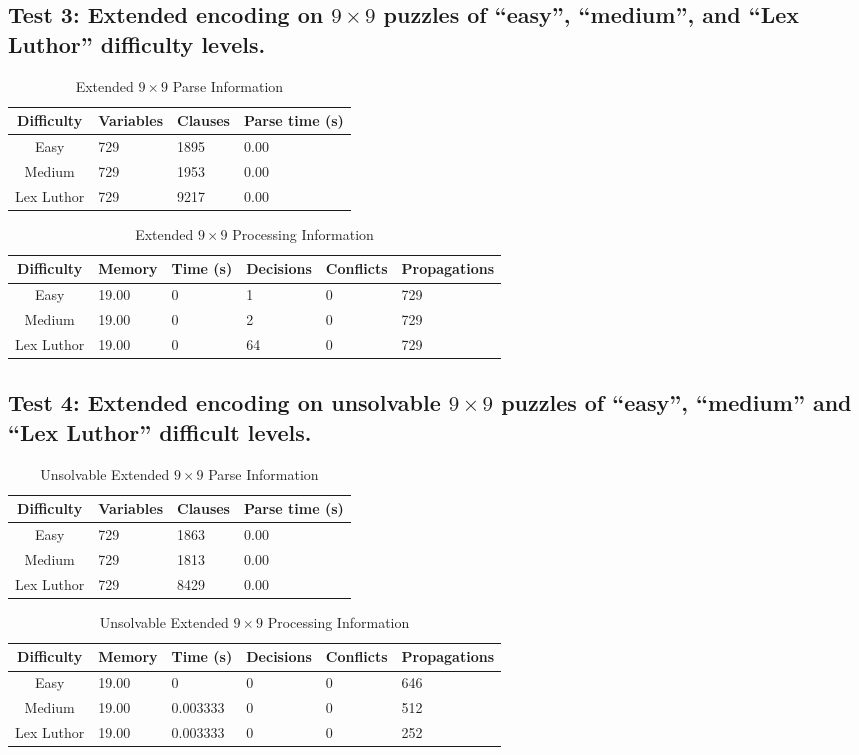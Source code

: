 \documentclass[conference,draftclsnofoot]{IEEEtran}
\begin{document}
\subsection{Test 3: Extended encoding on $9 \times 9$ puzzles of ``easy'', ``medium'',
and ``Lex Luthor'' difficulty levels.}
\FloatBarrier
\begin{table}[!h]
	\centering
	\begin{tabular}{c | l l l}
		Difficulty & Variables & Clauses & Parse time (s) \\\hline
		Easy 		& 729 & 1895 & 0.00 \\
		Medium 		& 729 & 1953 & 0.00 \\
		Lex Luthor 	& 729 & 9217 & 0.00
	\end{tabular}
	\caption{Extended $9 \times 9$ Parse Information}
	\label{tab:extended_9x9_parse}
\end{table}
\begin{table}[!h]
	\centering
	\begin{tabular}{c | l l p{20pt} p{20pt} l}
		Difficulty & Memory & Time (s) & Decisions &
		Conflicts & Propagations \\\hline
		Easy 		& 19.00 & 0 	& 1  & 0 & 729\\
		Medium 		& 19.00 & 0 	& 2  & 0 & 729\\
		Lex Luthor 	& 19.00 & 0 	& 64 & 0 & 729
	\end{tabular}
	\caption{Extended $9 \times 9$ Processing Information}
	\label{tab:extended_9x9_proc}
\end{table}
\FloatBarrier

\subsection{Test 4: Extended encoding on unsolvable $9 \times 9$ puzzles of ``easy'',
``medium'' and ``Lex Luthor'' difficult levels.}
\FloatBarrier
\begin{table}[!h]
	\centering
	\begin{tabular}{c | l l l}
		Difficulty & Variables & Clauses & Parse time (s) \\\hline
		Easy 		& 729 & 1863 & 0.00 \\
		Medium 		& 729 & 1813 & 0.00 \\
		Lex Luthor 	& 729 & 8429 & 0.00
	\end{tabular}
	\caption{Unsolvable Extended $9 \times 9$ Parse Information}
	\label{tab:extended_9x9_unsolvable_parse}
\end{table}
\begin{table}[!h]
	\centering
	\begin{tabular}{c | l l p{20pt} p{20pt}  l }
		Difficulty & Memory & Time (s) & Decisions &
		Conflicts & Propagations \\\hline
		Easy 		& 19.00 & 0 & 0  & 0  & 646 \\
		Medium 		& 19.00 & 0.003333 & 0 & 0  & 512 \\
		Lex Luthor 	& 19.00 & 0.003333 & 0 & 0 & 252
	\end{tabular}
	\caption{Unsolvable Extended $9 \times 9$ Processing Information}
	\label{tab:extended_8x8_unsolvable_proc}
\end{table}
\FloatBarrier
\end{document}
